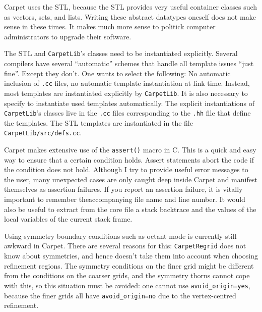 \documentclass{article}
\begin{document}
   Carpet uses the STL, because the STL provides very useful container
   classes such as vectors, sets, and lists.  Writing these abstract
   datatypes oneself does not make sense in these times.  It makes
   much more sense to politick computer administrators to upgrade
   their software.

   The STL and \texttt{CarpetLib}'s classes need to be instantiated
   explicitly.  Several compilers have several ``automatic'' schemes
   that handle all template issues ``just fine''.  Except they don't.
   One wants to select the following: No automatic inclusion of
   \texttt{.cc} files, no automatic template instantiation at link
   time.  Instead, most templates are instantiated explicitly by
   \texttt{CarpetLib}.  It is also necessary to specify to instantiate
   used templates automatically.  The explicit instantiations of
   \texttt{CarpetLib}'s classes live in the \texttt{.cc} files
   corresponding to the \texttt{.hh} file that define the templates.
   The STL templates are instantiated in the file
   \texttt{CarpetLib/src/defs.cc}.

   Carpet makes extensive use of the \texttt{assert()} macro in C.
   This is a quick and easy way to ensure that a certain condition
   holds.  Assert statements abort the code if the condition does not
   hold.  Although I try to provide useful error messages to the user,
   many unexpected cases are only caught deep inside Carpet and
   manifest themselves as assertion failures.  If you report an
   assertion failure, it is vitally important to remember
   theaccompanying file name and line number.  It would also be useful
   to extract from the core file a stack backtrace and the values of
   the local variables of the current stack frame.

   Using symmetry boundary conditions such as octant mode is currently
   still awkward in Carpet.  There are several reasons for this:
   \texttt{CarpetRegrid} does not know about symmetries, and hence
   doesn't take them into account when choosing refinement regions.
   The symmetry conditions on the finer grid might be different from
   the conditions on the coarser grids, and the symmetry thorns cannot
   cope with this, so this situation must be avoided: one cannot use
   \texttt{avoid\_origin=yes}, because the finer grids all have
   \texttt{avoid\_origin=no} due to the vertex-centred refinement.
\end{document}
